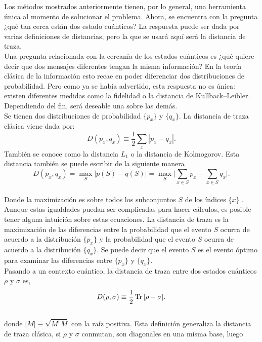 Los métodos mostrados anteriormente tienen, por lo general, una herramienta única al momento de solucionar el problema. Ahora, se encuentra con la pregunta ¿qué tan cerca están dos estado cuánticos? La respuesta puede ser dada por varias definiciones de distancias, pero la que se usará aquí será la distancia de traza.
\\
Una pregunta relacionada con la cercanía de los estados cuánticos es ¿qué quiere decir que dos mensajes diferentes tengan la misma información? En la teoría clásica de la información esto recae en poder diferenciar dos distribuciones de probabilidad. Pero como ya se había advertido, esta respuesta no es única: existen diferentes medidas como la fidelidad o la distancia de Kullback–Leibler. Dependiendo del fin, será deseable una sobre las demás.
\\
Se tienen dos distribuciones de probabilidad $\{ p_{x} \}$ y $\{ q_{x} \}$. La distancia de traza clásica viene dada por:
\begin{equation}
D(p_{x},q_{x})\equiv \frac{1}{2} \sum_{x}|p_{x}-q_{x}|.
\end{equation}
También se conoce como la distancia $L_{1}$ o la distancia de Kolmogorov. Esta distancia también se puede escribir de la siguiente manera 
\begin{equation}
D(p_{x},q_{x})= \max_{S} \big| p(S)-q(S) \big| = \max_{S} \Bigg| \sum_{x \in S}p_{x}-\sum_{x \in S}q_{x} \Bigg|.
\end{equation}
\\
Donde la maximización es sobre todos los subconjuntos $S$ de los índices $\{ x \}$ \cite{NielsenInformation}. Aunque estas igualdades puedan ser complicadas para hacer cálculos, es posible tener alguna intuición sobre estas ecuaciones. La distancia de traza es la maximización de las diferencias entre la probabilidad que el evento $S$ ocurra de acuerdo a la distribución $\{p_{x} \}$ y la probabilidad que el evento $S$ ocurra de acuerdo a la distribución $\{q_{x} \}$. Se puede decir que el evento $S$ es el evento óptimo para examinar las diferencias entre $\{p_{x} \}$ y $\{q_{x} \}$.
\\
Pasando a un contexto cuántico, la distancia de traza entre dos estados cuánticos $\rho$ y $\sigma$ es,
\begin{equation}
D(\rho,\sigma) \equiv \frac{1}{2} \Tr |\rho-\sigma|.	
\end{equation}
\\
donde $|M| \equiv \sqrt{M^{\dagger}M}$ con la raíz positiva. Esta definición generaliza la distancia de traza clásica, si $\rho$ y $\sigma$ conmutan, son diagonales en una misma base, luego
